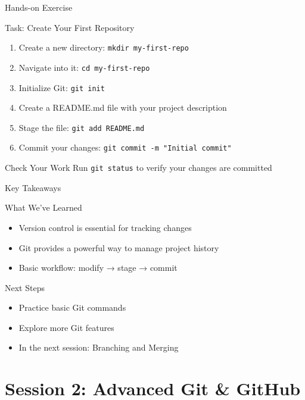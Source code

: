 \documentclass[aspectratio=169]{beamer}
\begin{document}
\begin{frame}{Hands-on Exercise}
  \begin{block}{Task: Create Your First Repository}
    \begin{enumerate}
      \item Create a new directory: \texttt{mkdir my-first-repo}
      \item Navigate into it: \texttt{cd my-first-repo}
      \item Initialize Git: \texttt{git init}
      \item Create a README.md file with your project description
      \item Stage the file: \texttt{git add README.md}
      \item Commit your changes: \texttt{git commit -m "Initial commit"}
    \end{enumerate}
  \end{block}
  
  \begin{alertblock}{Check Your Work}
    Run \texttt{git status} to verify your changes are committed
  \end{alertblock}
\end{frame}

\begin{frame}{Key Takeaways}
  \begin{block}{What We've Learned}
    \begin{itemize}
      \item Version control is essential for tracking changes
      \item Git provides a powerful way to manage project history
      \item Basic workflow: modify → stage → commit
    \end{itemize}
  \end{block}
  
  \begin{block}{Next Steps}
    \begin{itemize}
      \item Practice basic Git commands
      \item Explore more Git features
      \item In the next session: Branching and Merging
    \end{itemize}
  \end{block}
\end{frame}

\section{Session 2: Advanced Git \& GitHub}
\end{document}
